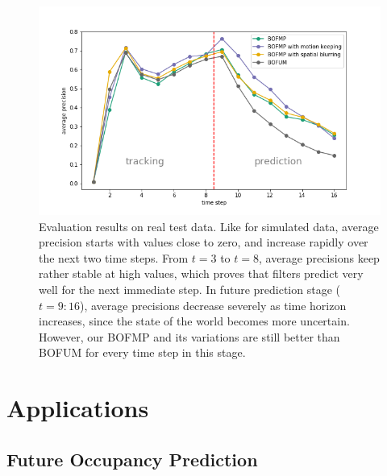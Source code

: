 \begin{figure}[ht]
  \centering
   \captionsetup{width=\linewidth}
    \includegraphics[width=.8\textwidth]{figures/test_on_real_data.png}
    \caption{Evaluation results on real test data. Like for simulated data, average precision starts with values close to zero, and increase rapidly over the next two time steps. From $t=3$ to $t=8$, average precisions keep rather stable at high values, which proves that filters predict very well for the next immediate step. In future prediction stage ($t=9:16$), average precisions decrease severely as time horizon increases, since the state of the world becomes more uncertain. However, our BOFMP and its variations are still better than BOFUM for every time step in this stage.}
    \label{fig:real_test_data}
\end{figure}

\section{Applications}

\subsection{Future Occupancy Prediction}


